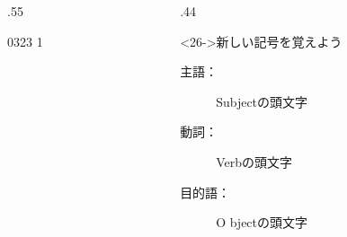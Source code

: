 \documentclass[aspectratio=169,xcolor={dvipsnames,table}]{beamer}
\begin{document}
\begin{frame}[plain]
\begin{columns}[t]
\begin{column}{.55\textwidth}
\begin{alertblock}
\begin{itemize}
\end{itemize}
 \end{alertblock}
%
\vspace*{-8pt}
{\tiny 0323}\,{\scriptsize {}\,1}

\end{column} 
\begin{column}{.44\textwidth}
 \begin{block}<26->{新しい記号を覚えよう}\small
       \begin{description}
	\item[主語：] S\hfill{ubjectの頭文字} 
	\item[動詞：] V\hfill{erbの頭文字}
	\item[目的語：] O \hfill{bjectの頭文字}
       \end{description}
      \end{block}
\end{column} 
\end{columns}

\end{frame}
\end{document}
